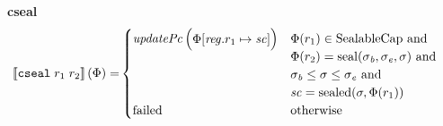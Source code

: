 \documentclass[a4paper]{article}
\begin{document}
\noindent\textbf{cseal}\\
\begin{align*}
  \sem{\tcseal{r_1}{r_2}}(\Phi) = &
                                  \begin{cases}
                                    \updPcAddr{}\left(
                                    \arraycolsep=0pt
                                    \begin{array}{rl}
                                      \Phi&\updReg{r_1}{\vsc}
                                    \end{array}\right)
&
                                    \arraycolsep=0pt
                                    \begin{array}[t]{l}
                                      \Phi(r_1) \in \SealableCaps \tand \\
                                      \Phi(r_2) = \seal{\sigma_\baddr, \sigma_\eaddr,\sigma} \tand \\
                                      \sigma_\baddr \le \sigma \le \sigma_\eaddr \tand \\
                                      \vsc = \sealed{\sigma,\Phi(r_1)}
                                    \end{array}
                                    \\
                                    \failed & \totherwise
                                  \end{cases}
\end{align*}
\end{document}
